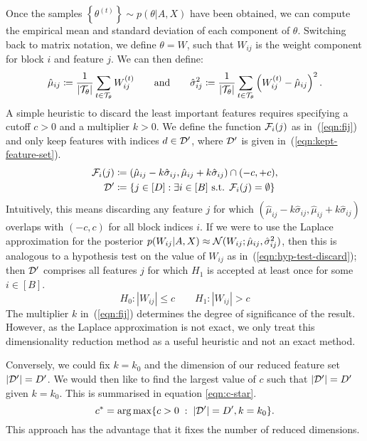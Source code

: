 Once the samples $\left\{ \theta^{(t)} \right\} \sim p(\theta | A, X)$
have been obtained, we can compute the empirical mean and standard deviation of each component of $\theta$. Switching back to matrix notation, we define $\theta = W$, such that $W_{ij}$ is the weight component for block $i$ and feature $j$. We can then define:
%
\begin{equation}
	\hat{\mu}_{ij} \coloneqq \frac{1}{|\mathcal{T}_\theta|} \sum_{t \in \mathcal{T}_\theta} W_{ij}^{(t)} \qquad \textrm{and} \qquad
	\hat{\sigma}_{ij}^2 \coloneqq \frac{1}{|\mathcal{T}_\theta|} \sum_{t \in \mathcal{T}_\theta} \left( W_{ij}^{(t)} - \hat{\mu}_{ij} \right)^2.
\end{equation}
%
A simple heuristic to discard the least important features requires specifying a cutoff $c > 0$ and a multiplier $k > 0$. We define the function $\mathcal{F}_i(j)$ 
as in~(\ref{eqn:fij}) and only keep features with indices $d \in \mathcal{D}'$, where $\mathcal{D}'$ is given in~(\ref{eqn:kept-feature-set}).
%
\begin{align}
	\mathcal{F}_i(j) &\coloneqq (\hat{\mu}_{ij} - k \hat{\sigma}_{ij}, \hat{\mu}_{ij} + k \hat{\sigma}_{ij}) \cap (-c, +c),
	\label{eqn:fij} \\
	\mathcal{D}' &\coloneqq \left\{ j \in [D] : \exists i \in [B] \textrm{ s.t. }  \mathcal{F}_i(j) = \emptyset \right\}
	\label{eqn:kept-feature-set}
\end{align}
%
Intuitively, this means discarding any feature $j$ for which 
$(\hat{\mu}_{ij} - k\hat{\sigma}_{ij}, \hat{\mu}_{ij} + k \hat{\sigma}_{ij})$ overlaps with
$(-c, c)$ for all block indices $i$. If we were to use the Laplace approximation for the posterior $p(W_{ij} | A, X) \approx \mathcal{N}(W_{ij}; \hat{\mu}_{ij}, \hat{\sigma}_{ij}^2)$, then this is analogous to a hypothesis test on the value of $W_{ij}$ as in~(\ref{eqn:hyp-test-discard});
then $\mathcal{D}'$ comprises all features $j$ for which $H_1$ is accepted at least once for some $i \in [B]$.
%
\begin{equation}
	H_0: |W_{ij}| \leq c \qquad
	H_1: |W_{ij}| > c
	\label{eqn:hyp-test-discard}
\end{equation}
%
The multiplier $k$ in~(\ref{eqn:fij}) determines the degree of significance of the result. However, as the Laplace approximation is not exact, we only treat this dimensionality reduction method as a useful heuristic and not an exact method.

Conversely, we could fix $k=k_0$ and the dimension of our reduced feature set $|\mathcal{D}'|=D'$. We would then like to find the largest value of $c$ such that $|\mathcal{D}'|=D'$ given $k=k_0$. This is summarised in equation \ref{eqn:c-star}.
%
\begin{equation}
	c^* = \operatorname*{arg\,max} \{c>0\; : \;|\mathcal{D}'| = D', k=k_0\}.
	\label{eqn:c-star}
\end{equation}
%
This approach has the advantage that it fixes the number of reduced dimensions.
